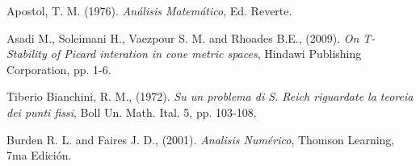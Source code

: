 \begin{thebibliography}{99}
  Apostol, T. M. (1976). {\em Análisis Matemático}, Ed. Reverte.

  Asadi M., Soleimani H., Vaezpour S. M. and  Rhoades B.E., (2009). {\em On T-Stability of Picard interation in cone metric spaces}, Hindawi Publishing Corporation, pp. 1-6.

 Tiberio Bianchini, R. M., (1972). {\em Su un problema di S. Reich riguardate la teoreia dei punti fissi}, Boll Un. Math. Ital. 5, pp. 103-108.

  Burden R. L. and Faires J. D., (2001). {\em Analisis Numérico}, Thomson Learning, 7ma Edición.

\end{thebibliography}

